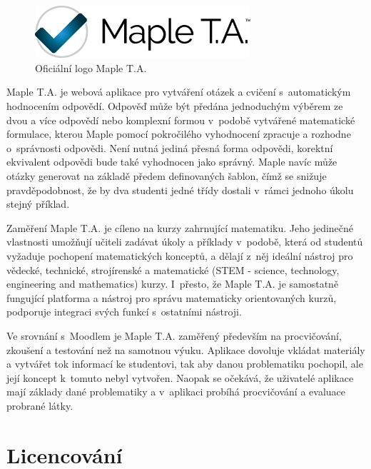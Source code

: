 \documentclass[
print,
  11pt,
  table,   
  nolof,    
  nolot,
  oneside,final
]{fithesis3}
\begin{document}
		\begin{figure}
		  \begin{center}
		    \includegraphics[width=80mm]{images/MapleTA_logo.jpg}
		   \end{center}
		  \caption{Oficiální logo Maple T.A.  \cite{maple-logo}}
		  \label{fig:maplelogo}
		\end{figure}

Maple T.A. je webová aplikace pro vytváření otázek a cvičení s~automatickým hodnocením odpovědí. Odpověď může být předána jednoduchým výběrem ze dvou a více odpovědí nebo komplexní formou v~podobě vytvářené matematické formulace, kterou Maple pomocí pokročilého vyhodnocení zpracuje a rozhodne o~správnosti odpovědi. Není nutná jediná přesná forma odpovědi, korektní ekvivalent odpovědi bude také vyhodnocen jako správný. Maple navíc může otázky generovat na základě předem definovaných šablon, čímž se snižuje pravděpodobnost, že by dva studenti jedné třídy dostali v~rámci jednoho úkolu stejný příklad.\cite{heck2004}

Zaměření Maple T.A. je cíleno na kurzy zahrnující matematiku. Jeho jedinečné vlastnosti umožňují učiteli zadávat úkoly a příklady v~podobě, která od studentů vyžaduje pochopení matematických konceptů, a dělají z~něj ideální nástroj pro vědecké, technické, strojírenské a matematické (STEM - science, technology, engineering and mathematics) kurzy. I~přesto, že Maple T.A. je samostatně fungující platforma a nástroj pro správu matematicky orientovaných kurzů, podporuje integraci svých funkcí s~ostatními nástroji. \cite{mapleta} 


Ve srovnání s~Moodlem je Maple T.A. zaměřený především na procvičování, zkoušení a testování než na samotnou výuku. Aplikace dovoluje vkládat materiály a vytvářet tok informací ke studentovi, tak aby danou problematiku pochopil, ale její koncept k~tomuto nebyl vytvořen. Naopak se očekává, že uživatelé aplikace mají základy dané problematiky a v~aplikaci probíhá procvičování a evaluace probrané látky.


	\section{Licencování}
\end{document}
